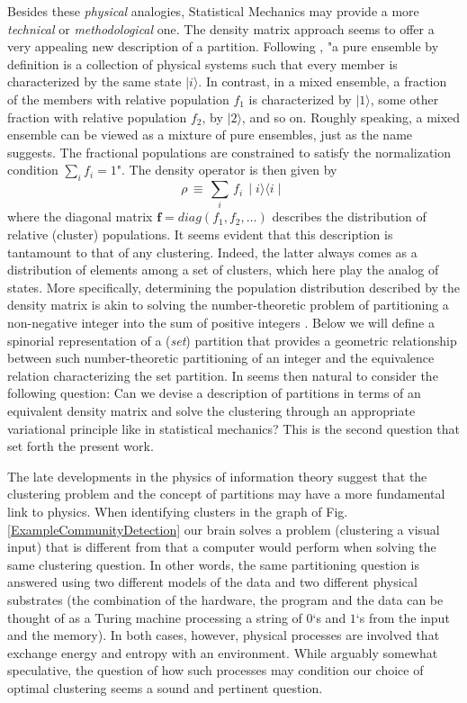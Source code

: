 \documentclass[twocolumn,aps,sort,nofootinbib]{revtex4}
\begin{document}
Besides these {\sl physical} analogies, Statistical Mechanics may provide
a more {\sl technical} or {\sl methodological} one.
The density matrix approach seems to offer a very appealing new description of a partition.
Following \cite{Sakurai94}, "a pure ensemble by definition is a collection of physical systems
such that every member is characterized by the same state $\mid i\rangle$. %
In contrast, in a mixed ensemble, a fraction of the members with relative population $f_1$
is characterized by $\mid 1\rangle$, some other fraction with relative population $f_2$, by
$\mid 2\rangle$, and so on. Roughly speaking, a mixed ensemble can be viewed as a mixture of pure
ensembles, just as the name suggests. The fractional populations are constrained to satisfy the
normalization condition $\sum_i f_i = 1$".
The density operator is then given by
\begin{equation}
\rho\,\equiv\,\sum_i\,f_i\,\mid i\rangle\langle i\mid\,
\end{equation}
where the diagonal matrix $\boldsymbol{f}=diag\left(f_1,f_2,\dots\right)$
describes the distribution of relative (cluster) populations. 
It seems evident that this description is tantamount to that of any clustering.
Indeed, the latter always comes as a distribution of elements among a set
of clusters, which here play the analog of states. More specifically,
determining the 
population distribution described by the density matrix 
is akin to 
solving the number-theoretic problem of partitioning
a non-negative
integer into the sum of positive integers \cite{AndrewsNT}. 
Below we will define a spinorial representation of a ({\sl set}) partition
that provides a geometric relationship between such number-theoretic
partitioning of an integer and the equivalence relation characterizing 
the set partition. In seems then natural to consider the following question:
Can we devise a description of partitions in terms of an equivalent 
density matrix and solve the clustering through an appropriate variational
principle like in statistical mechanics? This is the second question that
set forth the present work.

The late developments in the physics of
information theory suggest that the clustering problem and the
concept of partitions may have a more fundamental link to physics. When
identifying clusters in the graph of Fig.\ref{ExampleCommunityDetection} our
brain solves a problem (clustering a visual input) that is different from that
a computer would perform when solving the same clustering question.
In other words, the same partitioning question is answered using 
two different models of the data and two different physical 
substrates   
(the combination of the hardware, the program and the data can be thought
of as a Turing machine processing a string
of $0$`s and $1$`s from the input and the memory). 
In both cases, however, physical processes are involved that exchange
energy and entropy with an environment\cite{Zurek89-1,Zurek89-2}. 
While arguably somewhat speculative, the question of how such
processes may condition our choice of optimal clustering seems 
a sound and pertinent question.
\end{document}
